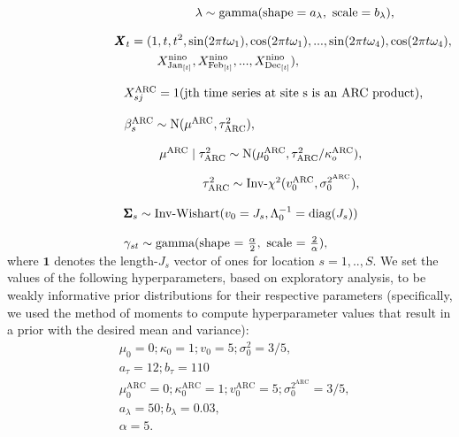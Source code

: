 \documentclass[11pt]{article}
\def\bSigma{\pmb{\Sigma}}
\def\bX{\pmb{X}}
\begin{document}
$\hspace{2.1in}
\lambda \sim \text{gamma}(\text{shape} = a_\lambda, \text{ scale} = b_\lambda),
$

\vspace{-0.4in}
\begin{align*}
\hspace{1.2in}
\bX_t &= (1, t, t^2, \sin(2\pi t \omega_1), \cos(2\pi t \omega_1),..., \sin(2\pi t \omega_4), \cos(2\pi t \omega_4), \\
& \hspace{0.3in} X^\text{nino}_{\text{Jan}_{[t]}}, X^\text{nino}_{\text{Feb}_{[t]}}, ..., X^\text{nino}_{\text{Dec}_{[t]}}),
\end{align*}

\vspace{-0.2in}
$\hspace{1.3in}
X^\text{ARC}_{sj} = 1(\text{jth time series at site s is an ARC product}),
$

$\hspace{1.3in}
\beta^\text{ARC}_s \sim \text{N}(\mu^\text{ARC}, \tau^2_\text{ARC}),
$

$\hspace{1.7in}
\mu^\text{ARC} \mid \tau_\text{ARC}^2 \sim \text{N}(\mu^\text{ARC}_0, \tau_\text{ARC}^2/\kappa_o^\text{ARC}),
$

$\hspace{2.18in}
\tau_\text{ARC}^2 \sim \text{Inv-}\chi^2(v_0^\text{ARC}, \sigma_0^{2^\text{ARC}}),
$

$\hspace{1.3in}
\bSigma_s \sim \text{Inv-Wishart}(v_0 = J_s, \Lambda_0^{-1} = \text{diag}(J_s))
$

$\hspace{1.3in}
\gamma_{st} \sim \text{gamma}(\text{shape = } \frac{\alpha}{2}, \text{ scale = } \frac{2}{\alpha}),
$ \\
where $\mathbf{1}$ denotes the length-$J_s$ vector of ones for location $s = 1, .., S$. We set the values of the following hyperparameters, based on exploratory analysis, to be weakly informative prior distributions for their respective parameters (specifically, we used the method of moments to compute hyperparameter values that result in a prior with the desired mean and variance):
\begin{align}
& \mu_0 = 0; \kappa_0 = 1; v_0 = 5; \sigma_0^2 = 3/5, \\
& a_\tau = 12; b_\tau = 110 \\
& \mu_0^\text{ARC} = 0; \kappa_0^\text{ARC} = 1; v_0^\text{ARC} = 5; \sigma_0^{2^\text{ARC}} = 3/5, \\
& a_\lambda = 50; b_\lambda = 0.03, \\
& \alpha = 5.
\end{align}
\end{document}
